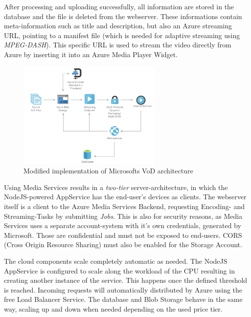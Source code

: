 After processing and 
uploading successfully, all information are stored in the database and the file 
is deleted from the webserver. These informations contain meta-information such as
title and description, but also an Azure streaming URL, pointing to a manifest file 
(which is needed for adaptive streaming using \textit{MPEG-DASH}).
This specific URL is used to stream the video directly from Azure by inserting 
it into an Azure Media Player Widget.
\begin{figure}[ht]
    \centering
    \includegraphics[height=200px]{ressources/architecture_new.png}  %
    \caption{Modified implementation of Microsofts VoD architecture}
    \label{fig:arch_new}
  \end{figure}

Using Media Services results in a \textit{two-tier} server-architecture, in 
which the NodeJS-powered AppService has the end-user's devices as clients. The 
webserver itself is a client to the Azure Media Services Backend, requesting 
Encoding- and Streaming-Tasks by submitting \textit{Jobs}. This is also for 
security reasons, as Media Services uses a separate account-system with it's 
own credentials, generated by Microsoft. Those are confidential and must not be
exposed to end-users. CORS (Cross Origin Resource Sharing) must also be enabled for 
the Storage Account. 

The cloud components scale completely automatic as needed. The NodeJS 
AppService is configured to scale along the workload of the CPU resulting in 
creating another instance of the service. This happens once the defined 
threshold is reached. Incoming requests will automatically distributed by Azure 
using the free Load Balancer Service. 
The database and Blob Storage behave in the same way, scaling up and down when 
needed depending on the used price tier.